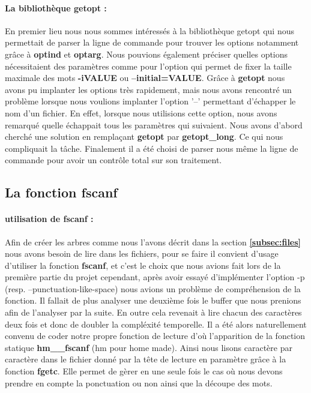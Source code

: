 \documentclass{article}
\begin{document}
\paragraph{La bibliothèque getopt :} 
En premier lieu nous nous sommes intéressés à la bibliothèque getopt qui nous permettait de parser 
la ligne de commande pour trouver les options notamment grâce à \textbf{optind} et \textbf{optarg}. 
Nous pouvions également préciser quelles options nécessitaient des paramètres comme pour l'option qui
permet de fixer la taille maximale des mots \textbf{-iVALUE} ou \textbf{--initial=VALUE}. Grâce à \textbf{getopt}
nous avons pu implanter les options très rapidement, mais nous avons rencontré un problème 
lorsque nous voulions implanter l'option '--' permettant d'échapper le nom d'un fichier.
En effet, lorsque nous utilisions cette option, nous avons remarqué quelle échappait tous les 
paramètres qui suivaient. Nous avons d'abord cherché une solution en remplaçant \textbf{getopt}
par \textbf{getopt\_long}. Ce qui nous compliquait la tâche. Finalement il a été choisi de parser
nous même la ligne de commande pour avoir un contrôle total sur son traitement.

\subsection{La fonction fscanf}\label{subsec:fscanf}
\paragraph{utilisation de fscanf :}
Afin de créer les arbres comme nous l'avons décrit dans la section \textbf{\ref{subsec:files}} nous avons
besoin de lire dans les fichiers, pour se faire il convient d'usage d'utiliser la fonction \textbf{fscanf}, et c'est le choix
que nous avions fait lors de la première partie du projet cependant, après avoir essayé d'implémenter l'option 
-p (resp. --punctuation-like-space) nous avions un problème de compréhension de la fonction. Il fallait de plus
analyser une deuxième fois le buffer que nous prenions afin de l'analyser par la suite. En outre cela revenait à lire chacun des caractères
deux fois et donc de doubler la compléxité temporelle. Il a été alors naturellement convenu de coder notre propre
fonction de lecture  d'où l'apparition de la fonction statique \textbf{hm\_\_fscanf} (hm pour home made). Ainsi nous lisons
caractère par caractère dans le fichier donné par la tête de lecture en paramètre grâce à la fonction \textbf{fgetc}.
Elle permet de gèrer en une seule fois le cas où nous devons prendre en compte la ponctuation ou non ainsi que la découpe des mots.
\end{document}
